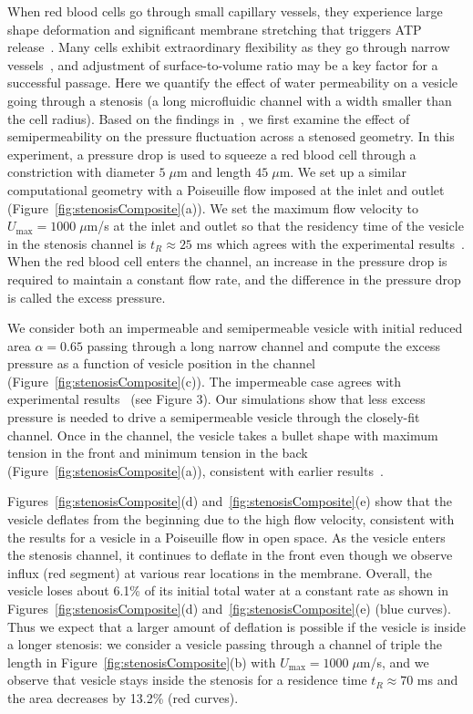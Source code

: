 \documentclass[prb,preprint,showpacs,preprintnumbers,amsmath,amssymb,longbibliography]{revtex4-1}
\begin{document}
When red blood cells go through small capillary vessels, they experience
large shape deformation and significant membrane stretching that
triggers ATP release~\cite{Wan2008_PNAS, ForsythWan2011_PNAS}.  Many
cells exhibit extraordinary flexibility as they go through narrow
vessels~\cite{AuStoreyMoore2016_PNAS}, and adjustment of
surface-to-volume ratio may be a key factor for a successful passage.
Here we quantify the effect of water permeability on a vesicle going
through a stenosis (a long microfluidic channel with a width smaller
than the cell radius).  Based on the findings in~\cite{abk-fai-sto2006},
we first examine the effect of semipermeability on the pressure
fluctuation across a stenosed geometry. In this experiment, a pressure
drop is used to squeeze a red blood cell through a constriction with
diameter $5\;\mu$m and length $45\;\mu$m. We set up a similar
computational geometry with a Poiseuille flow imposed at the inlet and
outlet (Figure~\ref{fig:stenosisComposite}(a)). We set the maximum flow
velocity to $U_{\max} = 1000 \;\mu$m/s at the inlet and outlet so that
the residency time of the vesicle in the stenosis channel is $t_R
\approx 25$ ms which agrees with the experimental
results~\cite{abk-fai-sto2006}. When the red blood cell enters the
channel, an increase in the pressure drop is required to maintain a
constant flow rate, and the difference in the pressure drop is called
the excess pressure.

We consider both an impermeable and semipermeable vesicle with initial
reduced area $\alpha = 0.65$ passing through a long narrow channel and
compute the excess pressure as a function of vesicle position in the
channel (Figure~\ref{fig:stenosisComposite}(c)). The impermeable case
agrees with experimental results~\cite{abk-fai-sto2006} (see Figure 3).
Our simulations show that less excess pressure is needed to drive a
semipermeable vesicle through the closely-fit channel. Once in the
channel, the vesicle takes a bullet shape with maximum tension in the
front and minimum tension in the back
(Figure~\ref{fig:stenosisComposite}(a)), consistent with earlier
results~\cite{Pak2015_PNAS, HarmanBertrandJoos2017_CJP}.

Figures~\ref{fig:stenosisComposite}(d)
and~\ref{fig:stenosisComposite}(e) show that the vesicle deflates from
the beginning due to the high flow velocity, consistent with the results
for a vesicle in a Poiseuille flow in open space. As the vesicle enters
the stenosis channel, it continues to deflate in the front even though
we observe influx (red segment) at various rear locations in the
membrane. Overall, the vesicle loses about 6.1\% of its initial total
water at a constant rate as shown in
Figures~\ref{fig:stenosisComposite}(d)
and~\ref{fig:stenosisComposite}(e) (blue curves). Thus we expect that a
larger amount of deflation is possible if the vesicle is inside a longer
stenosis: we consider a vesicle passing through a channel of triple the
length in Figure~\ref{fig:stenosisComposite}(b) with
$U_{\max}=1000\;\mu$m/s, and we observe that vesicle stays inside the
stenosis for a residence time $t_R \approx 70$ ms and the area decreases
by 13.2\% (red curves).
\end{document}
